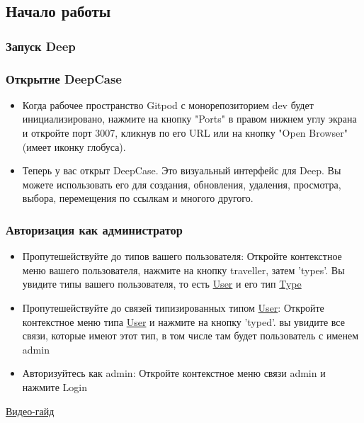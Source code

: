 \subsection{Начало работы}
\subsubsection{Запуск Deep}



\subsubsection{Открытие DeepCase}
\begin{itemize}
  \item Когда рабочее пространство Gitpod с монорепозиторием dev будет инициализировано, нажмите на кнопку "Ports" в правом нижнем углу экрана и откройте порт 3007, кликнув по его URL или на кнопку "Open Browser" (имеет иконку глобуса).
  \item Теперь у вас открыт DeepCase. Это визуальный интерфейс для Deep. Вы можете использовать его для создания, обновления, удаления, просмотра, выбора, перемещения по ссылкам и многого другого.
\end{itemize}
\subsubsection{Авторизация как администратор}
\begin{itemize}
  \item Пропутешействуйте до типов вашего пользователя: Откройте контекстное меню вашего пользователя, нажмите на кнопку traveller, затем 'types'. Вы увидите типы вашего пользователя, то есть \hyperlink{Core.User.Description}{User} и его тип \hyperlink{Core.Type.Description}{Type}
  \item Пропутешействуйте до связей типизированных типом \hyperlink{Core.User.Description}{User}: Откройте контекстное меню типа \hyperlink{Core.User.Description}{User} и нажмите на кнопку 'typed'. вы увидите все связи, которые имеют этот тип, в том числе там будет пользователь с именем admin
  \item Авторизуйтесь как admin: Откройте контекстное меню связи admin и нажмите Login
\end{itemize}
\href{https://youtu.be/6UgOiIZMYr8}{Видео-гайд}
